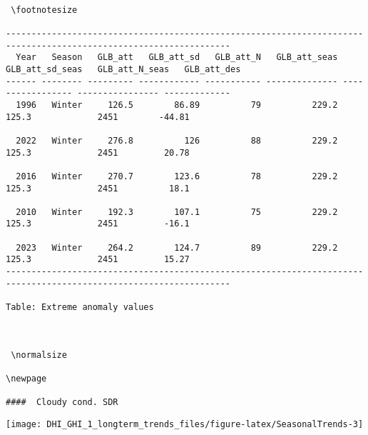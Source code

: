 \documentclass[
  10pt,
  a4paper,oneside]{article}
\begin{document}
\begin{verbatim}
 
 \footnotesize 
 
------------------------------------------------------------------------------------------------------------------
  Year   Season   GLB_att   GLB_att_sd   GLB_att_N   GLB_att_seas   GLB_att_sd_seas   GLB_att_N_seas   GLB_att_des
------ -------- --------- ------------ ----------- -------------- ----------------- ---------------- -------------
  1996   Winter     126.5        86.89          79          229.2             125.3             2451        -44.81

  2022   Winter     276.8          126          88          229.2             125.3             2451         20.78

  2016   Winter     270.7        123.6          78          229.2             125.3             2451          18.1

  2010   Winter     192.3        107.1          75          229.2             125.3             2451         -16.1

  2023   Winter     264.2        124.7          89          229.2             125.3             2451         15.27
------------------------------------------------------------------------------------------------------------------

Table: Extreme anomaly values


 
 \normalsize 
 
\newpage

####  Cloudy cond. SDR 
\end{verbatim}

\begin{center}\texttt{[image: DHI\_GHI\_1\_longterm\_trends\_files/figure-latex/SeasonalTrends-3]} \end{center}
\end{document}
